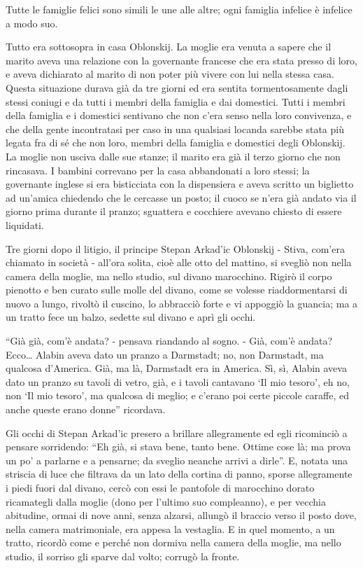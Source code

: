 \pagestyle{pagina}

Tutte le famiglie felici sono simili le une alle altre; ogni famiglia infelice è infelice a modo suo.

Tutto era sottosopra in casa Oblonskij. La moglie era venuta a sapere che il marito aveva una relazione con la governante francese che era stata presso di loro, e aveva dichiarato al marito di non poter più vivere con lui nella stessa casa. Questa situazione durava già da tre giorni ed era sentita tormentosamente dagli stessi coniugi e da tutti i membri della famiglia e dai domestici. Tutti i membri della famiglia e i domestici sentivano che non c'era senso nella loro convivenza, e che della gente incontratasi per caso in una qualsiasi locanda sarebbe stata più legata fra di sé che non loro, membri della famiglia e domestici degli Oblonskij. La moglie non usciva dalle sue stanze; il marito era già il terzo giorno che non rincasava. I bambini correvano per la casa abbandonati a loro stessi; la governante inglese si era bisticciata con la dispensiera e aveva scritto un biglietto ad un'amica chiedendo che le cercasse un posto; il cuoco se n'era già andato via il giorno prima durante il pranzo; sguattera e cocchiere avevano chiesto di essere liquidati. 

Tre giorni dopo il litigio, il principe Stepan Arkad'ic Oblonskij - Stiva, com'era chiamato in società - all'ora solita, cioè alle otto del mattino, si svegliò non nella camera della moglie, ma nello studio, sul divano marocchino. Rigirò il corpo pienotto e ben curato sulle molle del divano, come se volesse riaddormentarsi di nuovo a lungo, rivoltò il cuscino, lo abbracciò forte e vi appoggiò la guancia; ma a un tratto fece un balzo, sedette sul divano e aprì gli occhi. 

``Già già, com'è andata? - pensava riandando al sogno. - Già, com'è andata? Ecco\ldots{} Alabin aveva dato un pranzo a Darmstadt; no, non Darmstadt, ma qualcosa d'America. Già, ma là, Darmstadt era in America. Sì, sì, Alabin aveva dato un pranzo su tavoli di vetro, già, e i tavoli cantavano `Il mio tesoro', eh no, non `Il mio tesoro', ma qualcosa di meglio; e c'erano poi certe piccole caraffe, ed anche queste erano donne'' ricordava. 

Gli occhi di Stepan Arkad'ic presero a brillare allegramente ed egli ricominciò a pensare sorridendo: ``Eh già, si stava bene, tanto bene. Ottime cose là; ma prova un po' a parlarne e a pensarne; da sveglio neanche arrivi a dirle''. E, notata una striscia di luce che filtrava da un lato della cortina di panno, sporse allegramente i piedi fuori dal divano, cercò con essi le pantofole di marocchino dorato ricamategli dalla moglie (dono per l'ultimo suo compleanno), e per vecchia abitudine, ormai di nove anni, senza alzarsi, allungò il braccio verso il posto dove, nella camera matrimoniale, era appesa la vestaglia. E in quel momento, a un tratto, ricordò come e perché non dormiva nella camera della moglie, ma nello studio, il sorriso gli sparve dal volto; corrugò la fronte. 

